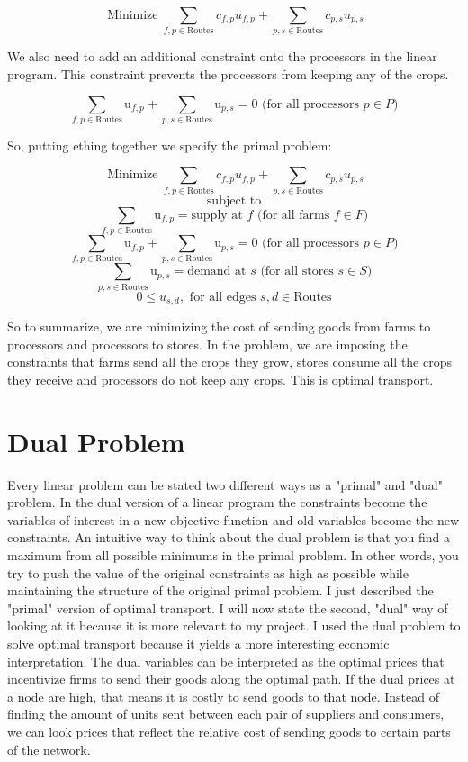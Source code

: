\documentclass{report}
\begin{document}
$$\operatorname{Minimize} \sum_{f,p \in \text{Routes}} c_{f,p} u_{f,p} + \sum_{p,s \in \text{Routes}} c_{p,s} u_{p,s}$$

We also need to add an additional constraint onto the processors in the linear program. This constraint prevents the processors from keeping any of the crops.

$$\sum_{f,p \in \text{Routes}} \text{u}_{f,p} + \sum_{p,s \in \text{Routes}} \text{u}_{p,s} = 0 \text{ (for all processors } p \in P)$$

So, putting ething together we specify the primal problem:

$$\operatorname{Minimize} \sum_{f,p \in \text{Routes}} c_{f,p} u_{f,p} + \sum_{p,s \in \text{Routes}} c_{p,s} u_{p,s}$$
$$\text{subject to}$$
$$\sum_{f,p \in \text{Routes}} \text{u}_{f,p}= \text{supply at } f \text{ (for all farms } f \in F)$$
$$\sum_{f,p \in \text{Routes}} \text{u}_{f,p} + \sum_{p,s \in \text{Routes}} \text{u}_{p,s} = 0 \text{ (for all processors } p \in P)$$
$$\sum_{p,s \in \text{Routes}} \text{u}_{p,s}= \text{demand at } s \text{ (for all stores } s \in S)$$
$$0 \leq u_{s,d}, \text{ for all edges } s,d \in \text{Routes}$$

So to summarize, we are minimizing the cost of sending goods from farms to processors and processors to stores. In the problem, we are imposing the constraints that farms send all the crops they grow, stores consume all the crops they receive and processors do not keep any crops. This is  optimal transport.

\section{Dual Problem}

Every linear problem can be stated two different ways as a "primal" and "dual" problem. In the dual version of a linear program the constraints become the variables of interest in a new objective function and old variables become the new constraints. An intuitive way to think about the dual problem is that you find a maximum from all possible minimums in the primal problem. In other words, you try to push the value of the original constraints as high as possible while maintaining the structure of the original primal problem. I just described the "primal" version of optimal transport. I will now state the second, "dual" way of looking at it because it is more relevant to my project. I used the dual problem to solve optimal transport because it yields a more interesting economic interpretation. The dual variables can be interpreted as the optimal prices that incentivize firms to send their goods along the optimal path. If the dual prices at a node are high, that means it is costly to send goods to that node. Instead of finding the amount of units sent between each pair of suppliers and consumers, we can look prices that reflect the relative cost of sending goods to certain parts of the network.
\end{document}
